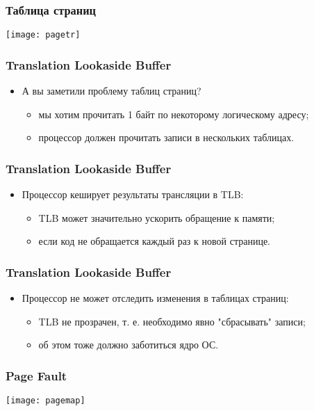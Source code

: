 \begin{frame}
\frametitle{Таблица страниц}
\texttt{[image: pagetr]}
\end{frame}

\begin{frame}
\frametitle{Translation Lookaside Buffer}
\begin{itemize}
    \item<1->А вы заметили проблему таблиц страниц?
    \begin{itemize}
        \item<2->мы хотим прочитать 1 байт по некоторому логическому адресу;
        \item<3->процессор должен прочитать записи в нескольких таблицах.
    \end{itemize}
\end{itemize}
\end{frame}

\begin{frame}
\frametitle{Translation Lookaside Buffer}
\begin{itemize}
    \item<1->Процессор кеширует результаты трансляции в TLB:
    \begin{itemize}
        \item<2->TLB может значительно ускорить обращение к памяти;
        \item<3->если код не обращается каждый раз к новой странице.
    \end{itemize}
\end{itemize}
\end{frame}

\begin{frame}
\frametitle{Translation Lookaside Buffer}
\begin{itemize}
    \item<1->Процессор не может отследить изменения в таблицах страниц:
    \begin{itemize}
        \item<2->TLB не прозрачен, т. е. необходимо явно "сбрасывать" записи;
        \item<3->об этом тоже должно заботиться ядро ОС.
    \end{itemize}
\end{itemize}
\end{frame}

\begin{frame}
\frametitle{Page Fault}
\texttt{[image: pagemap]}
\end{frame}

